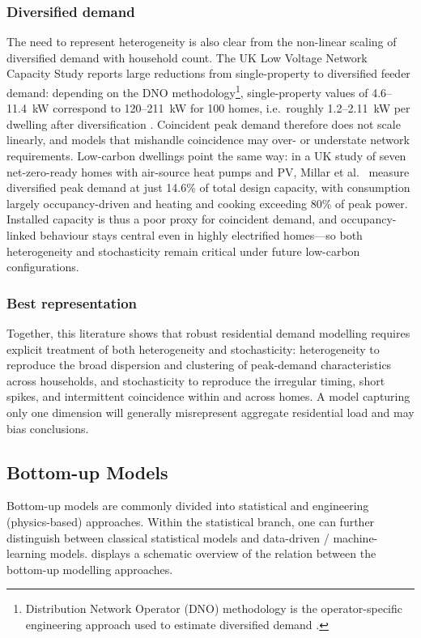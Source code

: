 \subsubsection*{Diversified demand}
The need to represent heterogeneity is also clear from the non-linear scaling of diversified demand with household count. The UK Low Voltage Network Capacity Study reports large reductions from single-property to diversified feeder demand: depending on the DNO methodology\footnote{Distribution Network Operator (DNO) methodology is the operator-specific engineering approach used to estimate diversified demand \cite{beis_ofgem_lv_network_capacity_2022}.}, single-property values of 4.6--11.4~kW correspond to 120--211~kW for 100 homes, i.e.\ roughly 1.2--2.11~kW per dwelling after diversification \cite{beis_ofgem_lv_network_capacity_2022}. Coincident peak demand therefore does not scale linearly, and models that mishandle coincidence may over- or understate network requirements. Low-carbon dwellings point the same way: in a UK study of seven net-zero-ready homes with air-source heat pumps and PV, Millar et al.\ \cite{millar_weng_mateo_garcia_boyd_2025} measure diversified peak demand at just 14.6\% of total design capacity, with consumption largely occupancy-driven and heating and cooking exceeding 80\% of peak power. Installed capacity is thus a poor proxy for coincident demand, and occupancy-linked behaviour stays central even in highly electrified homes—so both heterogeneity and stochasticity remain critical under future low-carbon configurations.

\subsubsection*{Best representation}
Together, this literature shows that robust residential demand modelling requires explicit treatment of both heterogeneity and stochasticity: heterogeneity to reproduce the broad dispersion and clustering of peak-demand characteristics across households, and stochasticity to reproduce the irregular timing, short spikes, and intermittent coincidence within and across homes. A model capturing only one dimension will generally misrepresent aggregate residential load and may bias conclusions.


\subsection{Bottom-up Models}\label{sec:bottomUpModelling}
Bottom-up models are commonly divided into statistical and engineering (physics-based) approaches. Within the statistical branch, one can further distinguish between classical statistical models and data-driven / machine-learning models.  displays a schematic overview of the relation between the bottom-up modelling approaches.  

